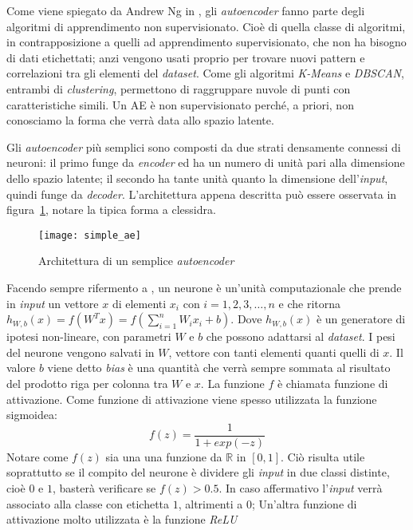Come viene spiegato da Andrew Ng in \cite{ng_sparse_ae}, gli \textit{autoencoder} fanno parte degli algoritmi di apprendimento non supervisionato.
Cioè di quella classe di algoritmi, in contrapposizione a quelli ad apprendimento supervisionato, che non ha bisogno di dati etichettati; anzi vengono usati proprio per trovare nuovi pattern e correlazioni tra gli elementi del \textit{dataset}.
Come gli algoritmi \textit{K-Means} e \textit{DBSCAN}, entrambi di \textit{clustering}, permettono di raggruppare nuvole di punti con caratteristiche simili. %
Un AE è non supervisionato perché, a priori, non conosciamo la forma che verrà data allo spazio latente. %

Gli \textit{autoencoder} più semplici sono composti da due strati densamente connessi di neuroni: il primo funge da \textit{encoder} ed ha un numero di unità pari alla dimensione dello spazio latente; il secondo ha tante unità quanto la dimensione dell'\textit{input}, quindi funge da \textit{decoder}.
L'architettura appena descritta può essere osservata in figura~\ref{fig:semplice_ae}, notare la tipica forma a clessidra.

\begin{figure}[ht] %
  \begin{center}
    \centering\texttt{[image: simple\_ae]}
  \end{center}
  \caption{Architettura di un semplice \textit{autoencoder}}
  \label{fig:semplice_ae}
\end{figure}


Facendo sempre rifermento a \cite{ng_sparse_ae}, un neurone è un'unità computazionale che prende in \textit{input} un vettore $x$ di elementi $x_i$ con $i=1,2,3,\dots,n$ e che ritorna $h_{W,b}(x) = f(W^Tx) = f(\sum_{i=1}^{n} W_i x_i + b)$.
Dove $h_{W,b}(x)$ è un generatore di ipotesi non-lineare, con parametri $W$ e $b$ che possono adattarsi al \textit{dataset}.
I pesi del neurone vengono salvati in $W$, vettore con tanti elementi quanti quelli di $x$.
Il valore $b$ viene detto \textit{bias} è una quantità che verrà sempre sommata al risultato del prodotto riga per colonna tra $W$ e $x$.
La funzione $f$ è chiamata funzione di attivazione.
Come funzione di attivazione viene spesso utilizzata la funzione sigmoidea:
\begin{equation*}
  f(z) = \frac{1}{1 + exp(-z)}
\end{equation*} %
Notare come $f(z)$ sia una una funzione da $\mathbb{R}$ in $[0,1]$.
Ciò risulta utile soprattutto se il compito del neurone è dividere gli \textit{input} in due classi distinte, cioè $0$ e $1$, basterà verificare se $f(z)>0.5$.
In caso affermativo l'\textit{input} verrà associato alla classe con etichetta $1$, altrimenti a $0$;
Un'altra funzione di attivazione molto utilizzata è la funzione \textit{ReLU}


